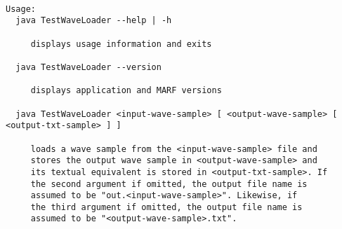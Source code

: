 \begin{verbatim}

Usage:
  java TestWaveLoader --help | -h

     displays usage information and exits

  java TestWaveLoader --version

     displays application and MARF versions

  java TestWaveLoader <input-wave-sample> [ <output-wave-sample> [ <output-txt-sample> ] ]

     loads a wave sample from the <input-wave-sample> file and
     stores the output wave sample in <output-wave-sample> and
     its textual equivalent is stored in <output-txt-sample>. If
     the second argument if omitted, the output file name is
     assumed to be "out.<input-wave-sample>". Likewise, if
     the third argument if omitted, the output file name is
     assumed to be "<output-wave-sample>.txt".

\end{verbatim}
